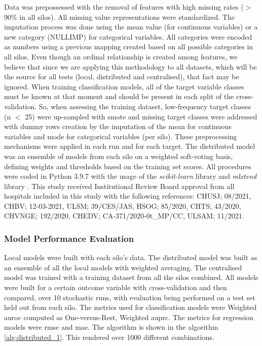 Data was prepossessed with the removal of features with high missing rates ($>$ 90\% in all silos). All missing value representations were standardized. The imputation process was done using the mean value (for continuous variables) or a new category (NULLIMP) for categorical variables. All categories were encoded as numbers using a previous mapping created based on all possible categories in all silos. Even though an ordinal relationship is created among features, we believe that since we are applying this methodology to all datasets, which will be the source for all tests (local, distributed and centralised), that fact may be ignored.
When training classification models, all of the target variable classes must be known at that moment and should be present in each split of the cross-validation. So, when assessing the training dataset, low-frequency target classes (n $<$ 25) were up-sampled with \ac{smote} \cite{smote} and missing target classes were addressed with dummy rows creation by the imputation of the mean for continuous variables and mode for categorical variables (per silo). These preprocessing mechanisms were applied in each run and for each target.
The distributed model was an ensemble of models from each silo on a weighted soft-voting basis, defining weights and thresholds based on the training set scores. 
All procedures were coded in Python 3.9.7 with the usage of the \textit{scikit-learn} library \cite{scikit-learn} and \textit{mlxtend} library \cite{mlxtend}.
This study received Institutional Review Board approval from all hospitals included in this study with the following references: CHUSJ; 08/2021, CHBV; 12-03-2021, ULSM; 39/CES/JAS, HSOG; 85/2020, CHTS; 43/2020, CHVNGE; 192/2020,
CHEDV; CA-371/2020-0t\_MP/CC, ULSAM; 11/2021.


\subsubsection{Model Performance Evaluation}

Local models were built with each silo's data. The distributed model was built as an ensemble of all the local models with weighted averaging. The centralised model was trained with a training dataset from all the silos combined. 
All models were built for a certain outcome variable with cross-validation and then compared, over 10 stochastic runs, with evaluation being performed on a test set held out from each silo. The metrics used for classification models were Weighted \ac{auroc} computed as One-versus-Rest, Weighted \ac{auprc}. The metrics for regression models were \ac{rmse} and \ac{mae}. The algorithm is shown in the algorithm \ref{alg:distributed_1}. This rendered over 1000 different combinations.


